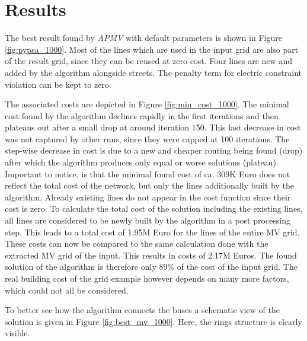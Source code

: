 %

\section{Results}



The best result found by \textit{APMV} with default parameters is shown in Figure \ref{fig:pypsa_1000}. Most of the lines which are used in the input grid are also part of the result grid, since they can be reused at zero cost. Four lines are new and added by the algorithm alongside streets. The penalty term for electric constraint violation can be kept to zero.



The associated costs are depicted in Figure \ref{fig:min_cost_1000}. The minimal cost found by the algorithm declines rapidly in the first iterations and then plateaus out after a small drop at around iteration 150. This last decrease in cost was not captured by other runs, since they were capped at 100 iterations. The step-wise decrease in cost is due to a new and cheaper routing being found (drop) after which the algorithm produces only equal or worse solutions (plateau). Important to notice, is that the minimal found cost of ca. 309K Euro does not reflect the total cost of the network, but only the lines additionally built by the algorithm. Already existing lines do not appear in the cost function since their cost is zero. To calculate the total cost of the solution including the existing lines, all lines are considered to be newly built by the algorithm in a post processing step. This leads to a total cost of 1.95M Euro for the lines of the entire MV grid. These costs can now be compared to the same calculation done with the extracted MV grid of the input. This results in costs of 2.17M Euros. The found solution of the algorithm is therefore only 89\% of the cost of the input grid. The real building cost of the grid example however depends on many more factors, which could not all be considered.





To better see how the algorithm connects the buses a schematic view of the solution is given in Figure \ref{fig:best_mv_1000}. Here, the rings structure is clearly visible. 





